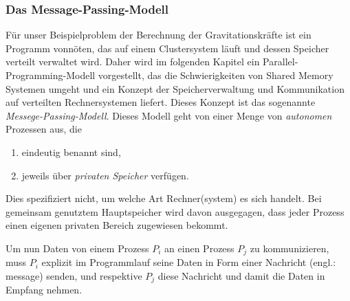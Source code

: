       \subsubsection{Das Message-Passing-Modell}
      \label{sec:mpm}
      Für unser Beispielproblem der Berechnung der Gravitationskräfte ist ein Programm vonnöten, das auf einem Clustersystem läuft und dessen Speicher verteilt verwaltet wird.
      Daher wird im folgenden Kapitel ein Parallel-Programming-Modell vorgestellt, das die Schwierigkeiten von Shared Memory Systemen umgeht und ein Konzept der Speicherverwaltung 
      und Kommunikation auf verteilten Rechnersystemen liefert.
      Dieses Konzept ist das sogenannte \textit{Messege-Passing-Modell}. 
      Dieses Modell geht von einer Menge von \textit{autonomen} Prozessen aus, die
      \begin{enumerate}
       \item eindeutig benannt sind,
       \item jeweils über \textit{privaten Speicher} verfügen.
      \end{enumerate}
      Dies spezifiziert nicht, um welche Art Rechner(system) es sich handelt. Bei gemeinsam genutztem Hauptspeicher wird davon ausgegagen, dass jeder Prozess einen eigenen privaten 
      Bereich zugewiesen bekommt.
      
      Um nun Daten von einem Prozess $P_i$ an einen Prozess $P_j$ zu kommunizieren, muss $P_i$ explizit im Programmlauf seine Daten in Form einer Nachricht (engl.: message) senden, und
      respektive $P_j$ diese Nachricht und damit die Daten in Empfang nehmen. 
      
